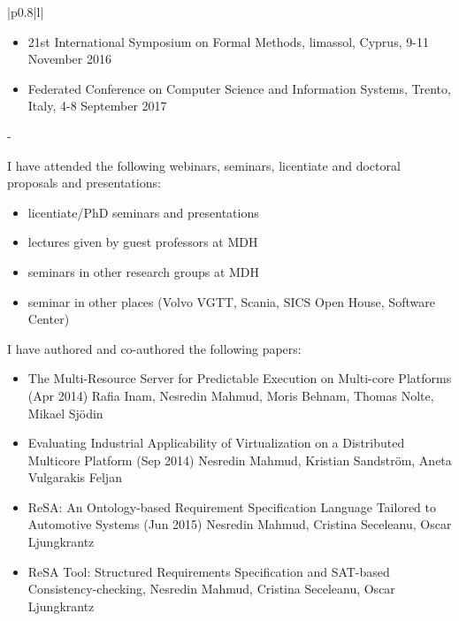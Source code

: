 \begin{longtable}{|p{0.8\linewidth}|l|}
\begin{minipage}{\linewidth}
\begin{itemize}
    \item 21st International Symposium on Formal Methods, limassol, Cyprus,  9-11 November 2016
    \item Federated Conference on Computer Science and Information Systems, Trento, Italy, 4-8 September 2017
  \end{itemize}
  \end{minipage}\hfill\vline\kern-\arrayrulewidth\\[2cm]
  \begin{minipage}{\linewidth} \vspace{0.2cm}
 I have attended the following webinars, seminars, licentiate and doctoral proposals and presentations:\vspace{-0.2cm}
  \begin{itemize}
  \itemsep-0.25em
  \item licentiate/PhD seminars and presentations
  \item lectures given by guest professors at MDH
  \item seminars in other research groups at MDH
  \item seminar in other places (Volvo VGTT, Scania, SICS Open House, Software Center)
  \end{itemize}
  I have authored and co-authored the following papers:
  \begin{itemize} \itemsep-0.25em
    \item The Multi-Resource Server for Predictable Execution on Multi-core Platforms (Apr 2014) 
    Rafia Inam, Nesredin Mahmud, Moris Behnam, Thomas Nolte, Mikael Sj{\"o}din 
    \item Evaluating Industrial Applicability of Virtualization on a Distributed Multicore Platform (Sep 2014) 
    Nesredin Mahmud, Kristian Sandstr{\"o}m, Aneta Vulgarakis Feljan 
    \item ReSA: An Ontology-based Requirement Specification Language Tailored to Automotive Systems (Jun 2015) 
    Nesredin Mahmud, Cristina Seceleanu, Oscar Ljungkrantz 
    \item ReSA Tool: Structured Requirements Specification and SAT-based Consistency-checking, Nesredin Mahmud, Cristina Seceleanu, Oscar Ljungkrantz


\end{itemize}
\end{minipage}
\end{longtable}
